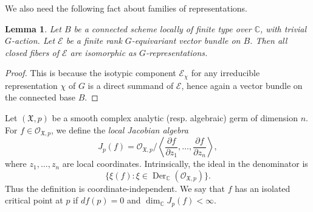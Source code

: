 \documentclass[12pt]{amsart}
\newtheorem{lemma}[theorem]{Lemma}
\theoremstyle{remark}
\begin{document}
We also need the following fact about families of representations. 

\begin{lemma}\label{lem:deformationlem}
Let $B$ be a connected scheme locally of finite type over $\mathbb{C}$, with trivial $G$-action. 
Let $\mathcal{E}$ be a finite rank $G$-equivariant vector bundle on $B$. 
Then all closed fibers of $\mathcal{E}$ are isomorphic as $G$-representations. 
\end{lemma}
\begin{proof}
This is because the isotypic component $\mathcal{E}_\chi$ for any irreducible representation $\chi$ of $G$ is a direct summand of $\mathcal{E}$, hence again a vector bundle on the connected base $B$.
\end{proof}

Let $(\mathfrak{X},p)$ be a smooth complex analytic (resp. algebraic) germ of dimension $n$. For $f\in\mathcal{O}_{\mathfrak X,p}$, we define the \emph{local Jacobian algebra}
\begin{equation} \label{eq:local-jacobian}
  J_p(f) = 
{\mathcal{O}_{\mathfrak{X},p}}\big/
{\left< \frac{\partial f}{\partial z_1},\ldots,\frac{\partial f}{\partial z_n}\right>},
\end{equation}
where $z_1,\ldots,z_n$ are local coordinates. Intrinsically, the ideal in
the denominator is
\[
  \{\xi(f):\xi\in\operatorname{Der}_\mathbb{C}(\mathcal{O}_{\mathfrak X,p})\}.
\]
Thus the definition is coordinate-independent. 
We say that $f$ has an isolated critical point at $p$ if $df(p)=0$ and $\dim_\mathbb{C} J_p(f)<\infty$. 
\end{document}
